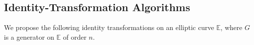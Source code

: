 \subsection{Identity-Transformation Algorithms}
\label{subsec:overview}

We propose the following identity transformations on an elliptic curve $\mathbb{E}$,
where $G$ is a generator on $\mathbb{E}$ of order $n$.



